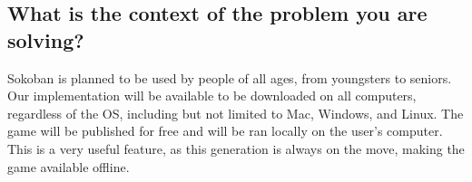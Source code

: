 \documentclass[11pt, oneside]{article}
\begin{document}
\subsection*{What is the context of the problem you are solving?}

Sokoban is planned to be used by people of all ages, from youngsters to seniors. Our implementation will be available to be downloaded on all computers, regardless of the OS, including but not limited to Mac, Windows, and Linux. The game will be published for free and will be ran locally on the user’s computer. This is a very useful feature, as this generation is always on the move, making the game available offline. 
\end{document}
